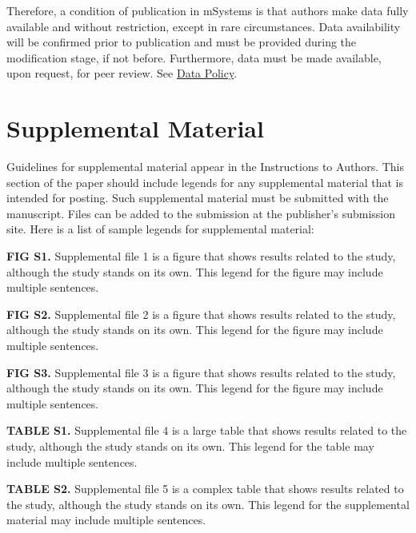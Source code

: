 \documentclass[lineno]{asm-article}
\begin{document}
Therefore, a condition of publication in mSystems is that authors make data fully available and without restriction, except in rare circumstances. Data availability will be confirmed prior to publication and must be provided during the modification stage, if not before. Furthermore, data must be made available, upon request, for peer review. See \href{http://msystems.asm.org/content/data-policy}{Data Policy}.

\section{Supplemental Material}
Guidelines for supplemental material appear in the Instructions to Authors. This section of the paper should include legends for any supplemental material that is intended for posting. Such supplemental material must be submitted with the manuscript. Files can be added to the submission at the publisher's submission site. Here is a list of sample legends for supplemental material: 

\textbf{FIG S1.} Supplemental file 1 is a figure that shows results related to the study, although the study stands on its own. This legend for the figure may include multiple sentences.

\textbf{FIG S2.} Supplemental file 2 is a figure that shows results related to the study, although the study stands on its own. This legend for the figure may include multiple sentences.

\textbf{FIG S3.} Supplemental file 3 is a figure that shows results related to the study, although the study stands on its own. This legend for the figure may include multiple sentences.

\textbf{TABLE S1.} Supplemental file 4 is a large table that shows results related to the study, although the study stands on its own. This legend for the table may include multiple sentences.

\textbf{TABLE S2.} Supplemental file 5 is a complex table that shows results related to the study, although the study stands on its own. This legend for the supplemental material may include multiple sentences.
\end{document}
